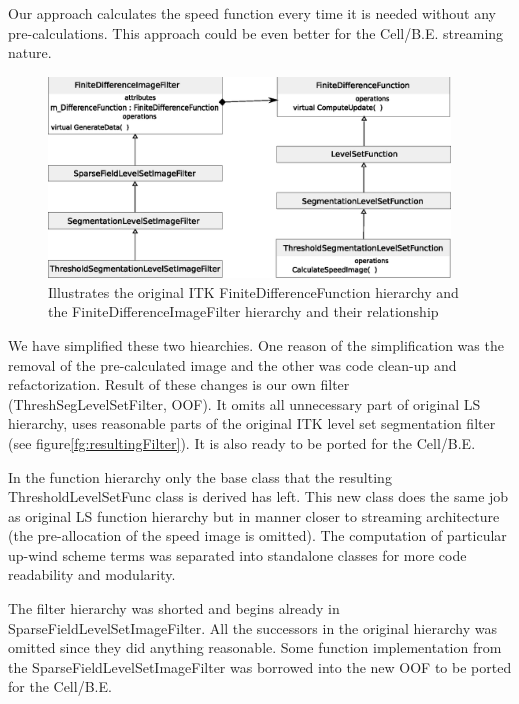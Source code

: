 \par
Our approach calculates the speed function every time it is needed without any pre-calculations.
This approach could be even better for the Cell/B.E. streaming nature.

\begin{figure}
    \centering
    \includegraphics[width=0.95\textwidth]{data/originalHierarchy}
    \caption[Original ITK thresholding level set filter class hierarchy]
{Illustrates the original ITK FiniteDifferenceFunction hierarchy and the FiniteDifferenceImageFilter hierarchy and their relationship}
    \label{fg:originalHierarchy}
\end{figure}

\par
We have simplified these two hiearchies.
One reason of the simplification was the removal of the pre-calculated image and the other was code clean-up and refactorization.
Result of these changes is our own filter (ThreshSegLevelSetFilter, OOF).
It omits all unnecessary part of original LS hierarchy, uses reasonable parts of the original ITK level set segmentation filter (see figure\ref{fg:resultingFilter}).
It is also ready to be ported for the Cell/B.E.

\par
In the function hierarchy only the base class that the resulting ThresholdLevelSetFunc class is derived has left.
This new class does the same job as original LS function hierarchy but in manner closer to streaming architecture (the pre-allocation of the speed image is omitted).
The computation of particular up-wind scheme terms was separated into standalone classes for more code readability and modularity.
\par
The filter hierarchy was shorted and begins already in SparseFieldLevelSetImageFilter.
All the successors in the original hierarchy was omitted since they did anything reasonable.
Some function implementation from the SparseFieldLevelSetImageFilter was borrowed into the new OOF to be ported for the Cell/B.E.

